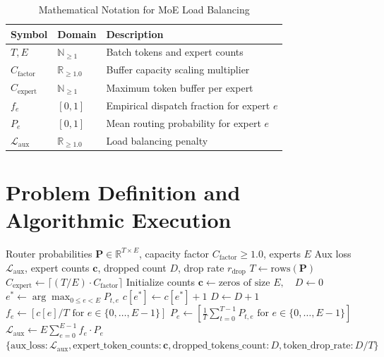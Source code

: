 \documentclass[11pt,a4paper]{article}
\theoremstyle{definition}
\begin{document}
\begin{table}[h]
\centering
\caption{Mathematical Notation for MoE Load Balancing}
\begin{tabular}{lll}
\toprule
\textbf{Symbol} & \textbf{Domain} & \textbf{Description} \\
\midrule
$T, E$ & $\mathbb{N}_{\ge 1}$ & Batch tokens and expert counts \\
$C_{\text{factor}}$ & $\mathbb{R}_{\ge 1.0}$ & Buffer capacity scaling multiplier \\
$C_{\text{expert}}$ & $\mathbb{N}_{\ge 1}$ & Maximum token buffer per expert \\
$f_e$ & $[0, 1]$ & Empirical dispatch fraction for expert $e$ \\
$P_e$ & $[0, 1]$ & Mean routing probability for expert $e$ \\
$\mathcal{L}_{\text{aux}}$ & $\mathbb{R}_{\ge 1.0}$ & Load balancing penalty \\
\bottomrule
\end{tabular}
\end{table}

\section{Problem Definition and Algorithmic Execution}

\begin{algorithm}[H]
\caption{MoE Load Balancing Loss and Capacity Allocation}
\label{alg:moe_load_balance}
\begin{algorithmic}[1]
\Require Router probabilities $\mathbf{P} \in \mathbb{R}^{T \times E}$, capacity factor $C_{\text{factor}} \ge 1.0$, experts $E$
\Ensure Aux loss $\mathcal{L}_{\text{aux}}$, expert counts $\mathbf{c}$, dropped count $D$, drop rate $r_{\text{drop}}$
\State $T \gets \text{rows}(\mathbf{P})$
\State $C_{\text{expert}} \gets \lceil (T / E) \cdot C_{\text{factor}} \rceil$
\State Initialize counts $\mathbf{c} \gets \text{zeros of size } E, \quad D \gets 0$
    \State $e^* \gets \arg\max_{0 \le e < E} P_{t, e}$
        \State $c[e^*] \gets c[e^*] + 1$
    \Else
        \State $D \gets D + 1$ 
    \EndIf
\EndFor
\State $f_e \gets [c[e] / T \text{ for } e \in \{0, \dots, E-1\}]$
\State $P_e \gets [\frac{1}{T} \sum_{t=0}^{T-1} P_{t, e} \text{ for } e \in \{0, \dots, E-1\}]$
\State $\mathcal{L}_{\text{aux}} \gets E \sum_{e=0}^{E-1} f_e \cdot P_e$
\State \Return $\{\text{aux\_loss}: \mathcal{L}_{\text{aux}}, \text{expert\_token\_counts}: \mathbf{c}, \text{dropped\_tokens\_count}: D, \text{token\_drop\_rate}: D / T\}$
\end{algorithmic}
\end{algorithm}
\end{document}
